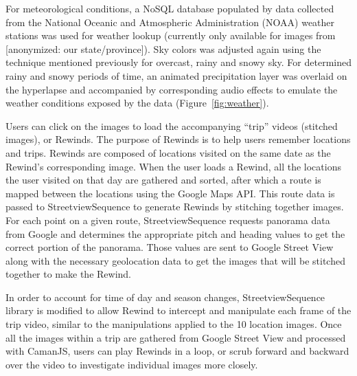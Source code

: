 \documentclass{sigchi}
\begin{document}
For meteorological conditions, a NoSQL database populated by data collected from the National Oceanic and Atmospheric Administration (NOAA) weather stations was used for weather lookup (currently only available for images from [anonymized: our state/province]). Sky colors was adjusted again using the technique mentioned previously for overcast, rainy and snowy sky. For determined rainy and snowy periods of time, an animated precipitation layer was overlaid on the hyperlapse and accompanied by corresponding audio effects to emulate the weather conditions exposed by the data (Figure~\ref{fig:weather}).





Users can click on the images to load the accompanying ``trip'' videos (stitched images), or Rewinds. The purpose of Rewinds is to help users remember locations and trips. Rewinds are composed of locations visited on the same date as the Rewind's corresponding image. When the user loads a Rewind, all the locations the user visited on that day are gathered and sorted, after which a route is mapped between the locations using the Google Maps API. This route data is passed to StreetviewSequence to generate Rewinds by stitching together images. For each point on a given route, StreetviewSequence requests panorama data from Google and determines the appropriate pitch and heading values to get the correct portion of the panorama. Those values are sent to Google Street View along with the necessary geolocation data to get the images that will be stitched together to make the Rewind.

In order to account for time of day and season changes, StreetviewSequence library is modified to allow Rewind to intercept and manipulate each frame of the trip video, similar to the manipulations applied to the 10 location images. Once all the images within a trip are gathered from Google Street View and processed with CamanJS, users can play Rewinds in a loop, or scrub forward and backward over the video to investigate individual images more closely.
\end{document}
